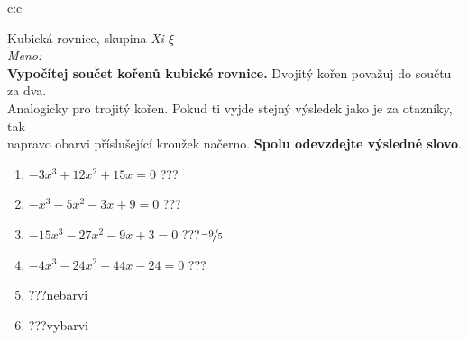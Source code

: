 \documentclass[10pt]{report}
\begin{document}
\clearpage
\thispagestyle{empty}
\begin{tabular}{c:c}
\begin{minipage}[c][99mm][t]{0.49\linewidth}
\begin{center}
\vspace{7mm}
{\huge Kubická rovnice, skupina \textit{Xi $\xi$} -}\\[4.5mm]
\textit{Meno:}\phantom{xxxxxxxxxxxxxxxxxxxxxxxxxxxxxxxxxxxxxxxxxxxxxxxxxxxxxxxxxxxxxxxxx}\\[3.5mm]
\textbf{Vypočítej součet kořenů kubické rovnice.} Dvojitý kořen považuj do součtu za dva.\\Analogicky pro trojitý kořen. Pokud ti vyjde stejný výsledek jako je za otazníky, tak\\napravo obarvi příslušející kroužek načerno. \textbf{Spolu odevzdejte výsledné slovo}.\\[3mm]
\begin{minipage}{0.77\linewidth}
\begin{center}
\begin{varwidth}{\textwidth}
\begin{enumerate}
\large
\item $-3x^3+12x^2+15x=0$\quad \dotfill\; ???\;\dotfill {}
\item $-x^3-5x^2-3x+9=0$\quad \dotfill\; ???\;\dotfill {}
\item $-15x^3-27x^2-9x+3=0$\quad \dotfill\; ???\;\dotfill \quad $\nicefrac{-9}{5}$
\item $-4x^3-24x^2-44x-24=0$\quad \dotfill\; ???\;\dotfill {}
\item \quad \dotfill\; ???\;\dotfill \quad nebarvi
\item \quad \dotfill\; ???\;\dotfill \quad vybarvi
\end{enumerate}
\end{varwidth}
\end{center}
\end{minipage}
\begin{minipage}{0.20\linewidth}
\begin{center}

\end{center}
\end{minipage}
\end{center}
\end{minipage}
\end{tabular}
\end{document}
